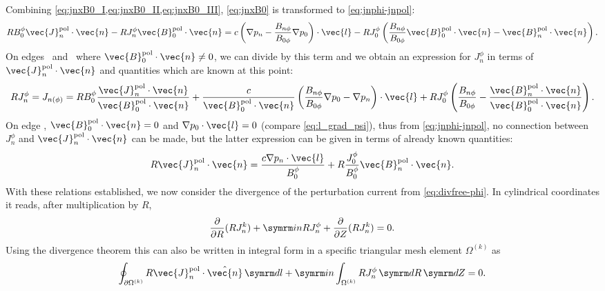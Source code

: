 Combining \cref{eq:jnxB0_I,eq:jnxB0_II,eq:jnxB0_III}, \cref{eq:jnxB0} is transformed to \cref{eq:jnphi-jnpol}:
\begin{gather}
  R B_{0}^{\phi} \vec{J}_{n}^{\pol} \cdot \vec{n} - R J_{n}^{\phi} \vec{B}_{0}^{\pol} \cdot \vec{n} = c \left ( \grad p_{n} - \frac{B_{n \phi}}{B_{0 \phi}} \grad p_{0} \right ) \cdot \vec{l} - R J_{0}^{\phi} \left ( \frac{B_{n \phi}}{B_{0 \phi}} \vec{B}_{0}^{\pol} \cdot \vec{n} - \vec{B}_{n}^{\pol} \cdot \vec{n} \right ). \label{eq:jnphi-jnpol}
\end{gather}
On edges \inw\ and \out\ where $\vec{B}_{0}^{\pol} \cdot \vec{n} \neq 0$, we can divide by this term and we obtain an expression for $J_{n}^{\phi}$ in terms of $\vec{J}_{n}^{\pol} \cdot \vec{n}$ and quantities which are known at this point:
\begin{gather}
  R J_{n}^{\phi} = J_{n (\phi)} = R B_{0}^{\phi} \frac{\vec{J}_{n}^{\pol} \cdot \vec{n}}{\vec{B}_{0}^{\pol} \cdot \vec{n}} + \frac{c}{\vec{B}_{0}^{\pol} \cdot \vec{n}} \left ( \frac{B_{n \phi}}{B_{0 \phi}} \grad p_{0} - \grad p_{n} \right ) \cdot \vec{l} + R J_{0}^{\phi} \left ( \frac{B_{n \phi}}{B_{0 \phi}} - \frac{\vec{B}_{n}^{\pol} \cdot \vec{n}}{\vec{B}_{0}^{\pol} \cdot \vec{n}} \right ). \label{eq:jnphi}
\end{gather}
On edge \fs, $\vec{B}_{0}^{\pol} \cdot \vec{n} = 0$ and $\grad p_{0} \cdot \vec{l} = 0$ (compare \cref{eq:l_grad_psi}), thus from \cref{eq:jnphi-jnpol}, no connection between $J_{n}^{\phi}$ and $\vec{J}_{n}^{\pol} \cdot \vec{n}$ can be made, but the latter expression can be given in terms of already known quantities:
\begin{gather}
  R \vec{J}_{n}^{\pol} \cdot \vec{n} = \frac{c \grad p_{n} \cdot \vec{l}}{B_{0}^{\phi}} + R \frac{J_{0}^{\phi}}{B_{0}^{\phi}} \vec{B}_{n}^{\pol} \cdot \vec{n}. \label{eq:If}
\end{gather}
With these relations established, we now consider the divergence of the perturbation current from \cref{eq:divfree-phi}. In cylindrical coordinates it reads, after multiplication by $R$,
\begin{gather}
  \pd{R} (R J_{n}^{k}) + \im n R J_{n}^{\phi} + \pd{Z} (R J_{n}^{k}) = 0.
\end{gather}
Using the divergence theorem this can also be written in integral form in a specific triangular mesh element $\Omega^{(k)}$ as
\begin{gather}
  \oint_{\partial \Omega^{(k)}} R \vec{J}_{n}^{\pol} \cdot \hat{\vec{n}} \, \diff l + \im n \int_{\Omega^{(k)}} R J_{n}^{\phi} \, \diff R \, \diff Z = 0.
\end{gather}
